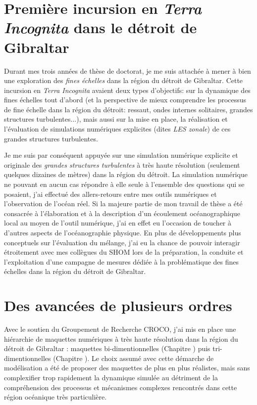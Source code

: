 

\section{Première incursion en \textit{Terra Incognita} dans le détroit de Gibraltar}
Durant mes trois années de thèse de doctorat, je me suis attachée à mener à bien une exploration des \textit{fines échelles} dans la région du détroit de Gibraltar. Cette incursion en \textit{Terra Incognita} avaient deux types d'objectifs: sur la dynamique des fines échelles tout d'abord (et la perspective de mieux comprendre les processus de fine échelle dans la région du détroit: ressaut, ondes internes solitaires, grandes structures turbulentes...), mais aussi sur la mise en place, la réalisation et l'évaluation de simulations numériques explicites (dites \textit{LES zonale}) de ces grandes structures turbulentes.

Je me suis par conséquent appuyée sur une simulation numérique explicite et originale des \textit{grandes structures turbulentes} à très haute résolution (seulement quelques dizaines de mètres) dans la région du détroit. La simulation numérique ne pouvant en aucun cas répondre à elle seule à l'ensemble des questions qui se posaient, j'ai effectué des allers-retours entre mes outils numériques et l'observation de l'océan réel. Si la majeure partie de mon travail de thèse a été consacrée à l'élaboration et à la description d'un écoulement océanographique local au moyen de l'outil numérique, j'ai en effet eu l'occasion de toucher à d'autres aspects de l'océanographie physique.
En plus de développements plus conceptuels sur l'évaluation du mélange,  j'ai eu la chance de pouvoir interagir étroitement avec mes collègues du SHOM lors de la préparation, la conduite et l'exploitation d'une campagne de mesures dédiée à la problématique des fines échelles dans la région du détroit de Gibraltar.

\section{Des avancées de plusieurs ordres}
Avec le soutien du Groupement de Recherche CROCO, j'ai mis en place une hiérarchie de maquettes numériques à très haute résolution dans la région du détroit de Gibraltar : maquettes bi-dimentionnelles (Chapitre ) puis tri-dimentionnelles (Chapitre ). Le choix assumé avec cette démarche de modélisation a été de proposer des maquettes de plus en plus réalistes, mais sans complexifier trop rapidement la dynamique simulée au détriment de la compréhension des processus et mécanismes complexes rencontrés dans cette région océanique très particulière. 

